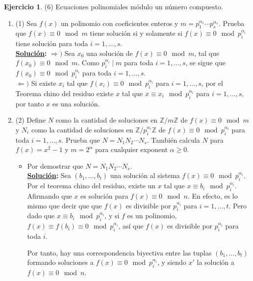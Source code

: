\documentclass[11pt,letterpaper]{article}
\theoremstyle{definition}\newtheorem{p}{Ejercicio}
\newcommand{\Z}{\mathbb{Z}}
\newcommand{\sol}{\textbf{\underline{Solución}: }} %
\begin{document}
\begin{p}(6)
Ecuaciones polinomiales m\'odulo un n\'umero compuesto.

\begin{enumerate}
    \item(1) Sea $f(x)$ un polinomio con coeficientes enteros y $m=p_1^{\alpha_1}\cdots p_s^{\alpha_s}$.
    Prueba que $f(x)\equiv 0\mod m$ tiene soluci\'on si y solamente si $f(x)\equiv 0\mod p_i^{\alpha_i}$
    tiene soluci\'on para toda $i=1,\ldots,s$.\\
    \sol $\Longrightarrow) $ Sea $x_0$ una solución de $f(x)\equiv 0\mod m$, tal que $f(x_0)\equiv 0\mod m$.
    Como $p_i^{\alpha_i} \mid m$ para toda $i=1, \ldots, s$, se sigue que $f(x_0)\equiv 0\mod p_i^{\alpha_i}$
    para toda $i=1, \ldots, s$.\\
    $\Longleftarrow) $ Si existe $x_i$ tal que $f(x_i)\equiv 0\mod p_i^{\alpha_i}$ para $i=1, \ldots, s$, 
    por el Teorema chino del residuo existe $x$ tal que $x \equiv x_i \mod p_i^{\alpha_i}$ para
    $i=1, \ldots, s$, por tanto $x$ es una solución.

    \item(2) Define $N$ como la cantidad de soluciones en $\Z/m\Z$ de $f(x)\equiv 0\mod m$ y $N_i$
    como la cantidad de soluciones en $\Z/p_i^{\alpha_i}\Z$ de $f(x)\equiv 0\mod p_i^{\alpha_i}$ para
    toda $i=1,\ldots,s$. Prueba que $N=N_1N_2\cdots N_s$. Tambi\'en calcula $N$ para $f(x)=x^2-1$ y
    $m=2^{\alpha}$ para cualquier exponent $\alpha\geq 0$.
    \begin{itemize}
      \item Por demostrar que $N=N_1N_2\cdots N_s$.\\
      \sol Sea $(b_1, \ldots, b_t)$ una solución al sistema $f(x) \equiv 0 \mod p_i^{\alpha_i}$. Por
      el teorema chino del residuo, existe un $x$ tal que $x \equiv b_i \mod p_i^{\alpha_i}$.
      Afirmando que $x$ es solución para $f(x) \equiv 0 \mod n$. En efecto, es lo mismo que decir que
      que $f(x)$ es divisible por $p_i^{\alpha_i}$ para $i=1,\ldots,t$. Pero dado que 
      $x \equiv b_i \mod p_i^{\alpha_i}$, y si $f$ es un polinomio, $f(x) \equiv f(b_i) \equiv 0 \mod p_i^{\alpha_i}$,
      así que $f(x)$ es divisible por $p_i^{\alpha_i}$ para toda $i$.

      Por tanto, hay una correspondencia biyectiva entre las tuplas $(b_1, \ldots, b_t)$ formando soluciones
      a $f(x) \equiv 0 \mod p_i^{\alpha_i}$, y siendo $x'$ la solución a $f(x) \equiv 0 \mod n$.


\end{itemize}
\end{enumerate}
\end{p}
\end{document}
